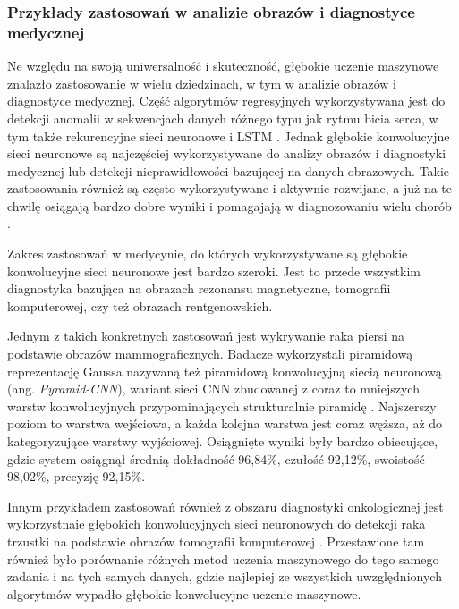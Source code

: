 \subsubsection{Przykłady zastosowań w analizie obrazów i diagnostyce medycznej}

Ne względu na swoją uniwersalność i skuteczność, głębokie uczenie maszynowe znalazło zastosowanie w wielu dziedzinach, w tym w analizie obrazów i diagnostyce medycznej.
Część algorytmów regresyjnych wykorzystywana jest do detekcji anomalii w sekwencjach danych różnego typu jak rytmu bicia serca, w tym także rekurencyjne sieci neuronowe i LSTM \cite{fernando2021deep}.
Jednak głębokie konwolucyjne sieci neuronowe są najczęściej wykorzystywane do analizy obrazów i diagnostyki medycznej lub detekcji nieprawidłowości bazującej na danych obrazowych.
Takie zastosowania również są często wykorzystywane i aktywnie rozwijane, a już na te chwilę osiągają bardzo dobre wyniki i pomagajają w diagnozowaniu wielu chorób \cite{liu2017survey}.

Zakres zastosowań w medycynie, do których wykorzystywane są głębokie konwolucyjne sieci neuronowe jest bardzo szeroki.
Jest to przede wszystkim diagnostyka bazująca na obrazach rezonansu magnetyczne, tomografii komputerowej, czy też obrazach rentgenowskich.

Jednym z takich konkretnych zastosowań jest wykrywanie raka piersi na podstawie obrazów mammograficznych.
Badacze wykorzystali piramidową reprezentację Gaussa nazywaną też piramidową konwolucyjną siecią neuronową (ang. \emph{Pyramid-CNN}), wariant sieci CNN zbudowanej z coraz to mniejszych warstw konwolucyjnych przypominających strukturalnie piramidę \cite{bakkouri2019multi}.
Najszerszy poziom to warstwa wejściowa, a każda kolejna warstwa jest coraz węższa, aż do kategoryzujące warstwy wyjściowej.
Osiągnięte wyniki były bardzo obiecujące, gdzie system osiągnął średnią dokładność 96,84\%, czułość 92,12\%, swoistość 98,02\%, precyzję 92,15\%.

Innym przykładem zastosowań również z obszaru diagnostyki onkologicznej jest wykorzystnaie głębokich konwolucyjnych sieci neuronowych do detekcji raka trzustki na podstawie obrazów tomografii komputerowej \cite{sekaran2020deep}.
Przestawione tam również było porównanie różnych metod uczenia maszynowego do tego samego zadania i na tych samych danych, gdzie najlepiej ze wszystkich uwzględnionych algorytmów wypadło głębokie konwolucyjne uczenie maszynowe.

